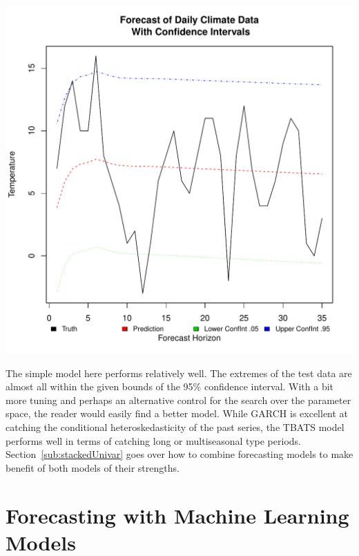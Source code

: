 \documentclass[12pt]{article}\usepackage[]{graphicx}\usepackage[]{color}
\makeatletter
\def\maxwidth{ %
  \ifdim\Gin@nat@width>\linewidth
    \linewidth
  \else
    \Gin@nat@width
  \fi
}
\newenvironment{knitrout}{}{} %
\theoremstyle{definition}
\makeatother
\begin{document}
\begin{knitrout}
\color{fgcolor}
\includegraphics[width=\maxwidth]{figure/trainGarchTuned4-1} 

\end{knitrout}
\doublespacing

The simple model here performs relatively well. The extremes of the test data are almost all within the given bounds of the 95\% confidence interval. With a bit more tuning and perhaps an alternative control for the search over the parameter space, the reader would easily find a better model. While GARCH is excellent at catching the conditional heteroskedasticity of the past series, the TBATS model performs well in terms of catching long or multiseasonal type periods. Section~\ref{sub:stackedUnivar} goes over how to combine forecasting models to make benefit of both models of their strengths.


\section{Forecasting with Machine Learning Models}
\label{sec:preproc}
\end{document}
